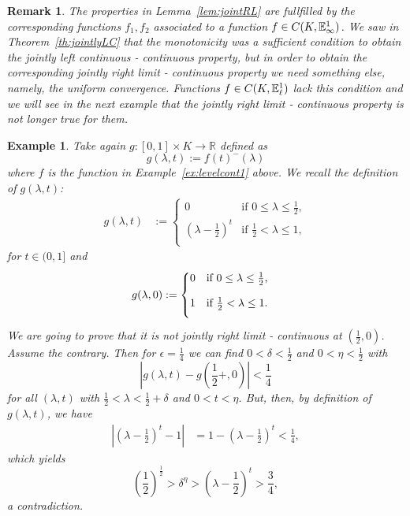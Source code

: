 \documentclass{amsart}
\newtheorem{example}[theorem]{Example}
\newtheorem{remark}[theorem]{Remark}
\newcommand{\R}{{\mathbb{R}}}
\newcommand{\fn}{\mathbb{E}\sp{1}}
\begin{document}
\begin{remark}

{\rm The properties in Lemma~\ref{lem:jointRL} are fullfilled by the corresponding functions $f_1,f_2$ associated to a function $f\in C(K,\fn_{\infty})$.
We saw in Theorem~\ref{th:jointlyLC} that the monotonicity was a sufficient condition to obtain the  jointly left continuous - continuous property, but in order to obtain the corresponding jointly  right limit - continuous property we need something else, namely, the uniform convergence. Functions $f\in C(K,\fn_{\ell})$ lack this condition and we will see in the next example that the jointly right limit - continuous property is not longer true for them.}
\end{remark}

\begin{example}
{\em Take again $g:[0,1]\times K\rightarrow \R$ defined as
$$g(\lambda,t):=f(t)^-(\lambda)$$
where $f$ is the function in Example~\ref{ex:levelcont1} above. We recall the definition of $g(\lambda,t)$:
\begin{align*}
g(\lambda,t)&:=\begin{cases}
0& \text {if $0\leq \lambda \leq \frac{1}{2}$},\\[2ex]
\left(\lambda-\frac{1}{2}\right)^t  & \text {if $\frac{1}{2} < \lambda  \leq 1,$}\\[2ex]
\end{cases}
\end{align*}
for $t\in (0,1]$ and
\begin{align*}
g(\lambda,0)&:=\begin{cases}
0 & \text {if $0\leq \lambda \leq \frac{1}{2}$,}\\[2ex]
1  & \text {if $ \frac{1}{2}<\lambda\leq 1.$}\\[2ex]
\end{cases}
\end{align*}
We are going to prove that it is not jointly right limit - continuous at $(\frac{1}{2},0)$.
Assume the contrary. Then for $\epsilon=\frac{1}{4}$ we can find
$0<\delta<\frac{1}{2}$ and $0<\eta<\frac{1}{2}$ with
$$\left|g(\lambda,t)-g\left(\frac{1}{2}+,0\right)\right|<\frac{1}{4}$$
for all $(\lambda,t)$ with $\frac{1}{2}<\lambda<\frac{1}{2}+\delta$ and $0<t<\eta$.
But, then, by definition of $g(\lambda,t)$, we have
\begin{align*}
\left|\left(\lambda-\frac{1}{2}\right)^t-1\right|&= 1-\left(\lambda-\frac{1}{2}\right)^t <\frac{1}{4},
\end{align*}
which yields
$$\left(\frac{1}{2}\right)^{\frac{1}{2}}>\delta^{\eta}>\left(\lambda-\frac{1}{2}\right)^t>\frac{3}{4},$$
a contradiction.
}
\end{example}
\end{document}
